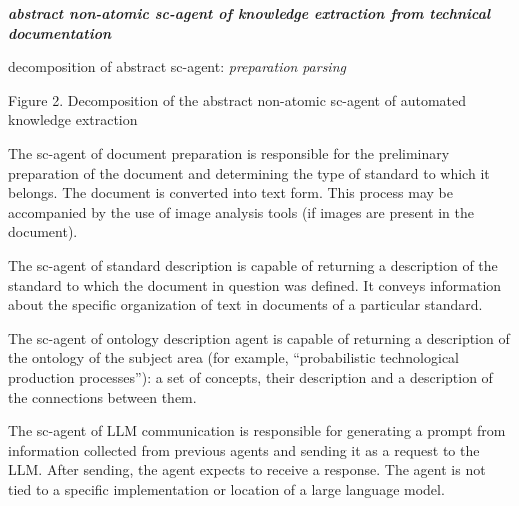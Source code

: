 \documentclass[11pt,final]{article}
\begin{document}
    \begin{multicols}{2}
    
        \noindent\textbf{\textit{abstract non-atomic sc-agent of knowledge extraction from technical documentation}}
        
        {\fontsize{3.4mm}{0}\begin{scnrelfromset}{decomposition of abstract sc-agent:}
            \textit{ \hspace{2em} preparation}
            \textit{ \hspace{2em} parsing}
        \end{scnrelfromset}}
            \vspace{1em}
        \noindent\footnotesize{Figure 2. Decomposition of the abstract non-atomic sc-agent of automated knowledge extraction}

            \vspace{2em}
            
        The sc-agent of document preparation is responsible
        for the preliminary preparation of the document and
        determining the type of standard to which it belongs. The
        document is converted into text form. This process may
        be accompanied by the use of image analysis tools (if
        images are present in the document).

        The sc-agent of standard description is capable of returning a description of the standard to which the document in question was defined. It conveys information about the specific organization of text in documents of a particular standard.

        The sc-agent of ontology description agent is capable of returning a description of the ontology of the subject area (for example, “probabilistic technological production processes”): a set of concepts, their description and a description of the connections between them.

        The sc-agent of LLM communication is responsible for generating a prompt from information collected from previous agents and sending it as a request to the LLM. After sending, the agent expects to receive a response. The agent is not tied to a specific implementation or location of a large language model.


\end{multicols}
\end{document}
